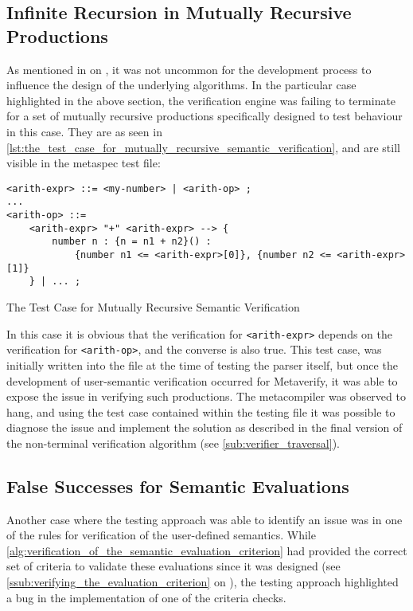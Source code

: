 \subsection{Infinite Recursion in Mutually Recursive Productions} %
\label{sub:infinite_recursion_in_mutually_recursive_productions}
As mentioned in  on , it was not uncommon for the development process to influence the design of the underlying algorithms.
In the particular case highlighted in the above section, the verification engine was failing to terminate for a set of mutually recursive productions specifically designed to test behaviour in this case. 
They are as seen in \autoref{lst:the_test_case_for_mutually_recursive_semantic_verification}, and are still visible in the metaspec test file:
\begin{listing}[!htb]
\begin{verbatim}
<arith-expr> ::= <my-number> | <arith-op> ;
...
<arith-op> ::= 
    <arith-expr> "+" <arith-expr> --> {
        number n : {n = n1 + n2}() :
            {number n1 <= <arith-expr>[0]}, {number n2 <= <arith-expr>[1]}
    } | ... ;
\end{verbatim}
\caption{The Test Case for Mutually Recursive Semantic Verification}
\label{lst:the_test_case_for_mutually_recursive_semantic_verification}
\end{listing}

In this case it is obvious that the verification for \texttt{<arith-expr>} depends on the verification for \texttt{<arith-op>}, and the converse is also true. 
This test case, was initially written into the file at the time of testing the parser itself, but once the development of user-semantic verification occurred for Metaverify, it was able to expose the issue in verifying such productions.
The metacompiler was observed to hang, and using the test case contained within the testing file it was possible to diagnose the issue and implement the solution as described in the final version of the non-terminal verification algorithm (see \autoref{sub:verifier_traversal}).


\subsection{False Successes for Semantic Evaluations} %
\label{sub:false_successes_for_semantic_evaluations}
Another case where the testing approach was able to identify an issue was in one of the rules for verification of the user-defined semantics. 
While \autoref{alg:verification_of_the_semantic_evaluation_criterion} had provided the correct set of criteria to validate these evaluations since it was designed (see \autoref{ssub:verifying_the_evaluation_criterion} on ), the testing approach highlighted a bug in the implementation of one of the criteria checks.\\

